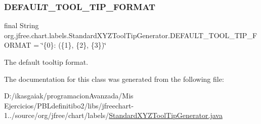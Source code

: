 \subsubsection{\texorpdfstring{D\+E\+F\+A\+U\+L\+T\+\_\+\+T\+O\+O\+L\+\_\+\+T\+I\+P\+\_\+\+F\+O\+R\+M\+AT}{DEFAULT\_TOOL\_TIP\_FORMAT}}
{\footnotesize\ttfamily final String org.\+jfree.\+chart.\+labels.\+Standard\+X\+Y\+Z\+Tool\+Tip\+Generator.\+D\+E\+F\+A\+U\+L\+T\+\_\+\+T\+O\+O\+L\+\_\+\+T\+I\+P\+\_\+\+F\+O\+R\+M\+AT = \char`\"{}\{0\}\+: (\{1\}, \{2\}, \{3\})\char`\"{}\hspace{0.3cm}{\ttfamily [static]}}

The default tooltip format. 

The documentation for this class was generated from the following file\+:\begin{DoxyCompactItemize}
\item 
D\+:/ikasgaiak/programacion\+Avanzada/\+Mis Ejercicios/\+P\+B\+Ldefinitibo2/libs/jfreechart-\/1../source/org/jfree/chart/labels/\mbox{\hyperlink{_standard_x_y_z_tool_tip_generator_8java}{Standard\+X\+Y\+Z\+Tool\+Tip\+Generator.\+java}}\end{DoxyCompactItemize}
